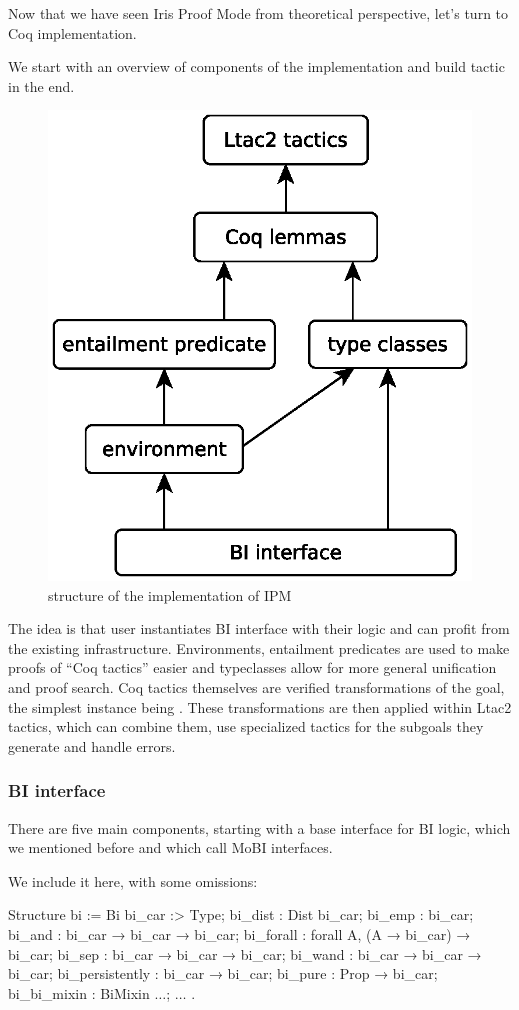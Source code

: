 Now that we have seen Iris Proof Mode from theoretical perspective, let's turn to Coq implementation.

We start with an overview of components of the implementation and build  tactic in the end.

\begin{figure}[H]
  \includegraphics[width=0.5\linewidth]{ipm-diagram}
  \caption{structure of the implementation of IPM}
\end{figure}

The idea is that user instantiates BI interface with their logic and can profit from the existing infrastructure.
Environments, entailment predicates are used to make proofs of ``Coq tactics'' easier and typeclasses allow for more general unification and proof search.
Coq tactics themselves are verified transformations of the goal, the simplest instance being .
These transformations are then applied within Ltac2 tactics, which can combine them, use specialized tactics for the subgoals they generate and handle errors.

\subsubsection{BI interface}
\label{subsubsec:bi-interface}

There are five main components, starting with a base interface for BI logic, which we mentioned before and which \citet{krebbersMoSeLGeneralExtensible2018} call MoBI interfaces.

We include it here, with some omissions:
\begin{coq}
Structure bi := Bi {
  bi_car :> Type;
  bi_dist : Dist bi_car;
  bi_emp : bi_car;
  bi_and : bi_car → bi_car → bi_car;
  bi_forall : forall A, (A → bi_car) → bi_car;
  bi_sep : bi_car → bi_car → bi_car;
  bi_wand : bi_car → bi_car → bi_car;
  bi_persistently : bi_car → bi_car;
  bi_pure : Prop → bi_car;
  bi_bi_mixin : BiMixin $\ldots$;
  $\ldots$
}.
\end{coq}

